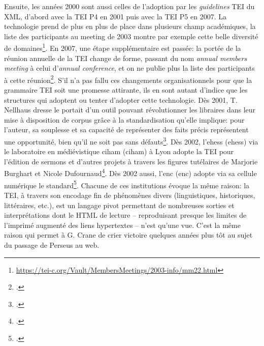 Ensuite, les années 2000 sont aussi celles de l'adoption par les \textit{guidelines} TEI du XML, d'abord avec la TEI P4 en 2001 puis avec la TEI P5 en 2007. La technologie prend de plus en plus de place dans plusieurs champ académiques, la liste des participants au meeting de 2003 montre par exemple cette belle diversité de domaines\footnote{\url{https://tei-c.org/Vault/MembersMeetings/2003-info/mm22.html}}. En 2007, une étape supplémentaire est passée: la portée de la réunion annuelle de la TEI change de forme, passant du nom \textit{annual members meeting} à celui d'\textit{annual conference}, et on ne publie plus la liste des participants à cette réunion\footcite{noauthor_members_nodate}. S'il n'a pas fallu ces changements organisationnels pour que la grammaire TEI soit une promesse attirante, ils en sont autant d'indice que les structures qui adoptent ou tenter d'adopter cette technologie. Dès 2001, T. Nellhaus dresse le portait d'un outil pouvant révolutionner les libraires dans leur mise à disposition de corpus grâce à la standardisation qu'elle implique: pour l'auteur, sa souplesse et sa capacité de représenter des faits précis représentent une opportunité, bien qu'il ne soit pas sans défauts\footcite{nellhaus_xml_2001}. Dès 2002, l'\acrfull{ehess} (\acrshort{ehess}) via le laboratoire en médiévistique  \acrfull{ciham} (\acrshort{ciham}) à Lyon adopte la TEI pour l'édition de sermons et d'autres projets à travers les figures tutélaires de Marjorie Burghart et Nicole Dufournaud\footcite{burghart_edition_2011}. Dès 2002 aussi, l'\acrfull{enc} (\acrshort{enc}) adopte via sa cellule numérique le standard\footcite{poupeau_les_2006}. Chacune de ces institutions évoque la même raison: la TEI, à travers son encodage fin de phénomènes divers (linguistiques, historiques, littéraires, etc.), est un langage pivot permettant de nombreuses sorties et interprétations dont le HTML de lecture -- reproduisant presque les limites de l'imprimé augmenté des liens hypertextes -- n'est qu'une vue. C'est la même raison qui permet à G. Crane de crier victoire quelques années plus tôt au sujet du passage de Perseus au web.

